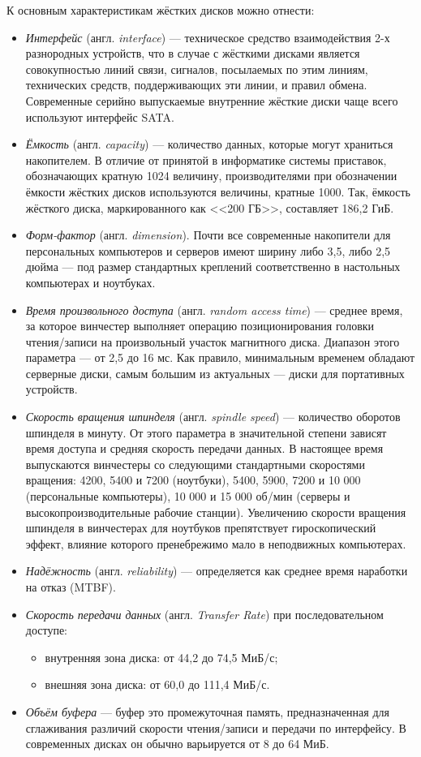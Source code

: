 К основным характеристикам жёстких дисков можно отнести:
\begin{itemize}
 \item \emph{Интерфейс} (англ. \emph{interface}) --- техническое средство взаимодействия 2-х разнородных устройств, что в случае с жёсткими дисками является совокупностью линий связи, сигналов, посылаемых по этим линиям, технических средств, поддерживающих эти линии, и правил обмена.
  Современные серийно выпускаемые внутренние жёсткие диски чаще всего используют интерфейс SATA.
 \item \emph{Ёмкость} (англ. \emph{capacity}) --- количество данных, которые могут храниться накопителем.
  В отличие от принятой в информатике системы приставок, обозначающих кратную 1024 величину, производителями при обозначении ёмкости жёстких дисков используются величины, кратные 1000.
  Так, ёмкость жёсткого диска, маркированного как <<200 ГБ>>, составляет 186,2 ГиБ.
 \item \emph{Форм-фактор} (англ. \emph{dimension}).
  Почти все современные накопители для персональных компьютеров и серверов имеют ширину либо 3,5, либо 2,5 дюйма --- под размер стандартных креплений соответственно в настольных компьютерах и ноутбуках.
 \item \emph{Время произвольного доступа} (англ. \emph{random access time}) --- среднее время, за которое винчестер выполняет операцию позиционирования головки чтения/записи на произвольный участок магнитного диска.
  Диапазон этого параметра --- от 2,5 до 16 мс.
  Как правило, минимальным временем обладают серверные диски, самым большим из актуальных --- диски для портативных устройств.
 \item \emph{Скорость вращения шпинделя} (англ. \emph{spindle speed}) --- количество оборотов шпинделя в минуту.
  От этого параметра в значительной степени зависят время доступа и средняя скорость передачи данных.
  В настоящее время выпускаются винчестеры со следующими стандартными скоростями вращения: 4200, 5400 и 7200 (ноутбуки), 5400, 5900, 7200 и 10 000 (персональные компьютеры), 10 000 и 15 000 об/мин (серверы и высокопроизводительные рабочие станции).
  Увеличению скорости вращения шпинделя в винчестерах для ноутбуков препятствует гироскопический эффект, влияние которого пренебрежимо мало в неподвижных компьютерах.
 \item \emph{Надёжность} (англ. \emph{reliability}) --- определяется как среднее время наработки на отказ (MTBF).
 \item \emph{Скорость передачи данных} (англ. \emph{Transfer Rate}) при последовательном доступе:
  \begin{itemize}
   \item внутренняя зона диска: от 44,2 до 74,5 МиБ/с;
   \item внешняя зона диска: от 60,0 до 111,4 МиБ/с.  
  \end{itemize}
 \item \emph{Объём буфера} --- буфер это промежуточная память, предназначенная для сглаживания различий скорости чтения/записи и передачи по интерфейсу.
  В современных дисках он обычно варьируется от 8 до 64 МиБ.
\end{itemize}

